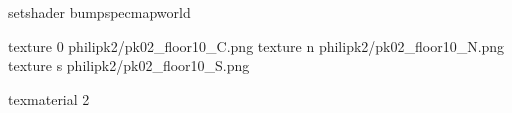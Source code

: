 setshader bumpspecmapworld

texture 0 philipk2/pk02_floor10_C.png
texture n philipk2/pk02_floor10_N.png
texture s philipk2/pk02_floor10_S.png

texmaterial 2
